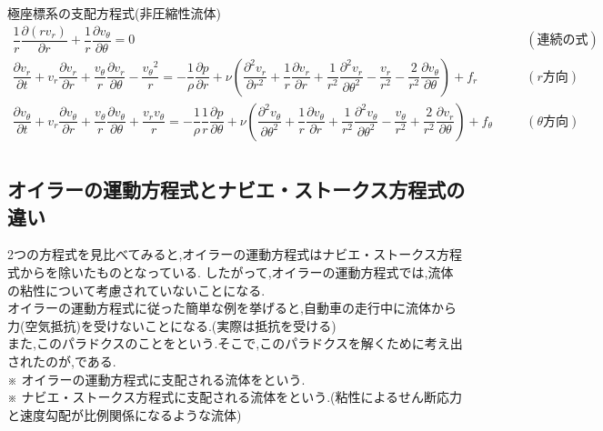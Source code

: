 \documentclass[a4paper]{jsarticle}
\begin{document}
\begin{itembox}[l]{極座標系の支配方程式\quad(非圧縮性流体)}
    \begin{eqnarray*}
        \dfrac{1}{r}\dfrac{\partial \left(rv_r\right)}{\partial r}+\dfrac{1}{r}\dfrac{\partial v_\theta}{\partial \theta}=0\quad&&(連続の式)\\
        \dfrac{\partial v_r}{\partial t}+v_r\dfrac{\partial v_r}{\partial r}+\dfrac{v_\theta}{r}\dfrac{\partial v_r}{\partial \theta}-\dfrac{{v_\theta}^2}{r}=-\dfrac{1}{\rho}\dfrac{\partial p}{\partial r}+\nu \left(\dfrac{\partial^2 v_r}{\partial r^2}+\dfrac{1}{r}\dfrac{\partial v_r}{\partial r}+\dfrac{1}{r^2}\dfrac{\partial^2 v_r}{\partial \theta^2}-\dfrac{v_r}{r^2}-\dfrac{2}{r^2}\dfrac{\partial v_\theta}{\partial \theta}\right)+f_r\quad&&(r方向)\\
        \dfrac{\partial v_\theta}{\partial t}+v_r\dfrac{\partial v_\theta}{\partial r}+\dfrac{v_\theta}{r}\dfrac{\partial v_\theta}{\partial \theta}+\dfrac{v_rv_\theta}{r}=-\dfrac{1}{\rho}\dfrac{1}{r}\dfrac{\partial p}{\partial \theta}+\nu\left(\dfrac{\partial^2 v_\theta}{\partial \theta^2}+\dfrac{1}{r}\dfrac{\partial v_\theta}{\partial r}+\dfrac{1}{r^2}\dfrac{\partial^2 v_\theta}{\partial \theta^2}-\dfrac{v_\theta}{r^2}+\dfrac{2}{r^2}\dfrac{\partial v_r}{\partial \theta}\right)+f_\theta\quad&&(\theta 方向)\\
    \end{eqnarray*}
\end{itembox}
\subsection{オイラーの運動方程式とナビエ・ストークス方程式の違い}
2つの方程式を見比べてみると,オイラーの運動方程式はナビエ・ストークス方程式からを除いたものとなっている.
したがって,オイラーの運動方程式では,流体の粘性について考慮されていないことになる.\\
オイラーの運動方程式に従った簡単な例を挙げると,自動車の走行中に流体から力(空気抵抗)を受けないことになる.(実際は抵抗を受ける)\\
また,このパラドクスのことをという.そこで,このパラドクスを解くために考え出されたのが,である.\\
※ オイラーの運動方程式に支配される流体をという.\\
※ ナビエ・ストークス方程式に支配される流体をという.(粘性によるせん断応力と速度勾配が比例関係になるような流体)
\end{document}
